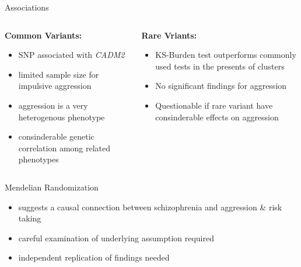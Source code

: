 \documentclass{beamer}
\begin{document}
\begin{frame}[t]{Associations}
  \small
  \begin{columns}[T]
    \begin{column}[T]{0.5\textwidth}
     \textbf{Common Variants:}
     \begin{itemize}
       \item SNP associated with \textit{CADM2}
       \item limited sample size for impulsive aggression
       \item aggression is a very heterogenous phenotype
       \item consinderable genetic correlation among related phenotypes 
     \end{itemize}
   \end{column}
   \begin{column}[T]{0.5\textwidth}
     \textbf{Rare Vriants:}
     \begin{itemize}
       \item KS-Burden test outperforms commonly used tests in the presents of clusters
       \item No significant findings for aggression
       \item Questionable if rare variant have consinderable effects on aggression
     \end{itemize}
   \end{column}
 \end{columns} 
\end{frame}

\begin{frame}[t]{Mendelian Randomization}
  \begin{itemize}
    \item suggests a causal connection between schizophrenia and aggression \& risk taking
    \item careful examination of underlying assumption required
    \item independent replication of findings needed
  \end{itemize}
\end{frame}


\end{document}
